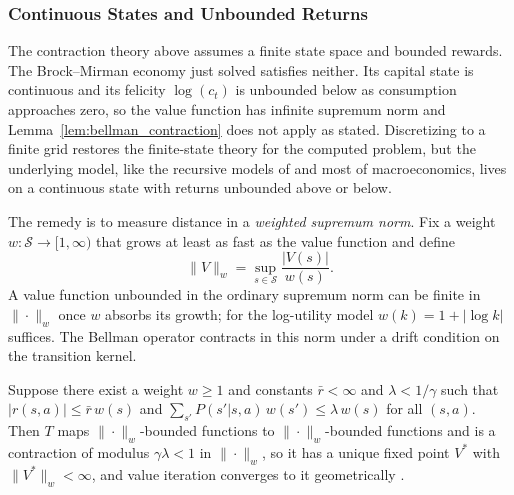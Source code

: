 \subsubsection{Continuous States and Unbounded Returns}
\label{sec:continuous_unbounded}

The contraction theory above assumes a finite state space and bounded rewards. The Brock--Mirman economy just solved satisfies neither. Its capital state is continuous and its felicity $\log(c_t)$ is unbounded below as consumption approaches zero, so the value function has infinite supremum norm and Lemma~\ref{lem:bellman_contraction} does not apply as stated. Discretizing to a finite grid restores the finite-state theory for the computed problem, but the underlying model, like the recursive models of \citet{stokey1989} and most of macroeconomics, lives on a continuous state with returns unbounded above or below.

The remedy is to measure distance in a \emph{weighted supremum norm}. Fix a weight $w: \mathcal{S} \to [1, \infty)$ that grows at least as fast as the value function and define
\begin{equation}
\|V\|_w = \sup_{s \in \mathcal{S}} \frac{|V(s)|}{w(s)}.
\label{eq:weighted_norm}
\end{equation}
A value function unbounded in the ordinary supremum norm can be finite in $\|\cdot\|_w$ once $w$ absorbs its growth; for the log-utility model $w(k) = 1 + |\log k|$ suffices. The Bellman operator contracts in this norm under a drift condition on the transition kernel.

\begin{theorem}
\label{thm:weighted_contraction}
Suppose there exist a weight $w \geq 1$ and constants $\bar{r} < \infty$ and $\lambda < 1/\gamma$ such that $|r(s,a)| \leq \bar{r}\, w(s)$ and $\sum_{s'} P(s'|s,a)\, w(s') \leq \lambda\, w(s)$ for all $(s,a)$. Then $T$ maps $\|\cdot\|_w$-bounded functions to $\|\cdot\|_w$-bounded functions and is a contraction of modulus $\gamma\lambda < 1$ in $\|\cdot\|_w$, so it has a unique fixed point $V^*$ with $\|V^*\|_w < \infty$, and value iteration converges to it geometrically \citep{wessels1977,bertsekas2018abstract}.
\end{theorem}


